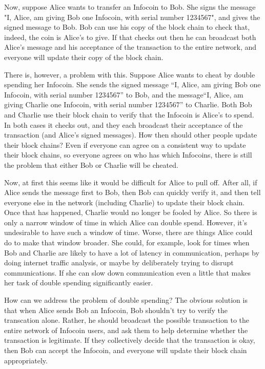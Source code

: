 \documentclass[12pt]{book}
\newcounter{problem}[chapter]
\newcounter{example}[chapter]
\begin{document}
Now, suppose Alice wants to transfer an Infocoin to Bob.  She signs
the message "I, Alice, am giving Bob one Infocoin, with serial number
1234567", and gives the signed message to Bob.  Bob can use his copy
of the block chain to check that, indeed, the coin is Alice's to give.
If that checks out then he can broadcast both Alice's message and his
acceptance of the transaction to the entire network, and everyone will
update their copy of the block chain.

There is, however, a problem with this.  Suppose Alice wants to cheat
by double spending her Infocoin.  She sends the signed message ``I,
Alice, am giving Bob one Infocoin, with serial number 1234567'' to
Bob, and the message``I, Alice, am giving Charlie one Infocoin, with
serial number 1234567'' to Charlie.  Both Bob and Charlie use their
block chain to verify that the Infocoin is Alice's to spend.  In both
cases it checks out, and they each broadcast their acceptance of the
transaction (and Alice's signed messages).  How then should other
people update their block chains?  Even if everyone can agree on a
consistent way to update their block chains, so everyone agrees on who
has which Infocoins, there is still the problem that either Bob or
Charlie will be cheated.

Now, at first this seems like it would be difficult for Alice to pull
off.  After all, if Alice sends the message first to Bob, then Bob can
quickly verify it, and then tell everyone else in the network
(including Charlie) to update their block chain.  Once that has
happened, Charlie would no longer be fooled by Alice. So there is only
a narrow window of time in which Alice can double spend.  However,
it's undesirable to have such a window of time.  Worse, there are
things Alice could do to make that window broader.  She could, for
example, look for times when Bob and Charlie are likely to have a lot
of latency in communication, perhaps by doing internet traffic
analysis, or maybe by deliberately trying to disrupt communications.
If she can slow down communication even a little that makes her task
of double spending significantly easier.

How can we address the problem of double spending?  The obvious
solution is that when Alice sends Bob an Infocoin, Bob shouldn't try
to verify the transcation alone.  Rather, he should broadcast the
possible transaction to the entire network of Infocoin users, and ask
them to help determine whether the transaction is legitimate.  If they
collectively decide that the transaction is okay, then Bob can accept
the Infocoin, and everyone will update their block chain
appropriately.
\end{document}
